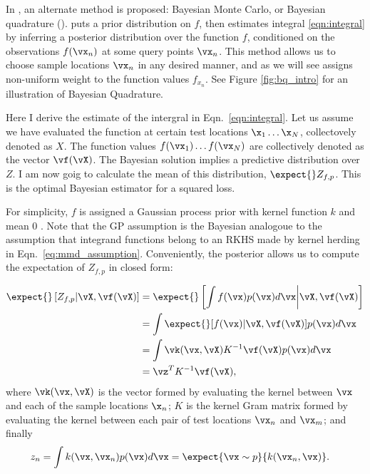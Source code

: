 In \citep{BZMonteCarlo}, an alternate method is proposed: Bayesian Monte Carlo, or Bayesian quadrature (\bq). \bq{} puts a prior distribution on $f$, then estimates integral \eqref{eqn:integral} by inferring a posterior distribution over the function $f$, conditioned on the observations $f(\vx_n)$ at some query points $\vx_n$. This method allows us to choose sample locations $\vx_n$ in any desired manner, and as we will see assigns non-uniform weight to the function values $f_{x_n}$. See Figure \ref{fig:bq_intro} for an illustration of Bayesian Quadrature.

Here I derive the \bq{} estimate of the intergral in Eqn.\ \eqref{eqn:integral}. Let us assume we have evaluated the function at certain test locations $\x_1 \ldots \x_N$, collectovely denoted as $X$. The function values $f(\vx_1) \ldots f(\vx_N)$ are collectively denoted as the vector $\vf(\vX)$. The Bayesian solution implies a predictive distribution over $Z$. I am now goig to calculate the mean of this distribution, $\expect{}Z_{f,p}$. This is the optimal Bayesian estimator for a squared loss.

For simplicity, $f$ is assigned a Gaussian process prior with kernel function $k$ and mean $0$ \citep{Rasmussen2006}. Note that the GP assumption is the Bayesian analogoue to the assumption that integrand functions belong to an RKHS made by kernel herding in Eqn.\ \eqref{eq:mmd_assumption}. Conveniently, the \gp{} posterior allows us to compute the expectation of $Z_{f,p}$ in closed form: 

\begin{align}
	\expect{} \left[Z_{f,p} \vert \vX, \vf(\vX) \right] &= \expect{} \left[ {\int f(\vx)p(\vx)d\vx} \middle\vert \vX, \vf(\vX) \right]\\
	 & = \int \expect{} [f(\vx) \vert \vX, \vf(\vX) ] p(\vx) d\vx\\
	 & = \int \vk(\vx, \vX) K^{-1} \vf(\vX) p(\vx) d\vx \\
	 & = \vz^T K^{-1} \vf(\vX),
	\label{eq:marg_mean_symbolic}
\end{align} 
where $\vk(\vx, \vX)$ is the vector formed by evaluating the kernel between $\vx$ and each of the sample locations $\x_n$; $K$ is the kernel Gram matrix formed by evaluating the kernel between each pair of test locations $\vx_n$ and $\vx_m$; and finally
\begin{align}
z_n & = \int k(\vx, \vx_n) p(\vx) d\vx = \expect{\vx \sim p}{k(\vx_n, \vx)}.
\end{align}

